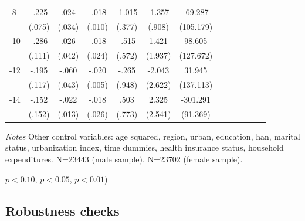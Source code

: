 \begin{table}[p]
\begin{adjustbox}{max width=\linewidth}
\begin{threeparttable}
{\begin{tabular}{l*{6}{S S}}
-8             &    -.225\sym{***}&     .024         &    -.018\sym{*}  &   -1.015\sym{***}&   -1.357         &  -69.287         \\
                &   (.075)         &   (.034)         &   (.010)         &   (.377)         &   (.908)         &(105.179)         \\
-10            &    -.286\sym{**} &     .026         &    -.018         &    -.515         &    1.421         &   98.605         \\
                &   (.111)         &   (.042)         &   (.024)         &   (.572)         &  (1.937)         &(127.672)         \\
-12           &    -.195\sym{*}  &    -.060         &    -.020\sym{***}&    -.265         &   -2.043         &   31.945         \\
                &   (.117)         &   (.043)         &   (.005)         &   (.948)         &  (2.622)         &(137.113)         \\
-14           &    -.152         &    -.022\sym{*}  &    -.018         &     .503         &    2.325         & -301.291\sym{***}\\
                &   (.152)         &   (.013)         &   (.026)         &   (.773)         &  (2.541)         & (91.369)         \\   
\bottomrule
\end{tabular}
\begin{tablenotes}
\item \textit{Notes} Other control variables: age squared, region, urban, education, han, marital status, urbanization index, time dummies, health insurance status, household expenditures. N=23443 (male sample), N=23702 (female sample).
\item \sym{*} \(p<0.10\), \sym{**} \(p<0.05\), \sym{***} \(p<0.01\))
\end{tablenotes}
}
\end{threeparttable}
\end{adjustbox}
\end{table}
\FloatBarrier

\clearpage
\subsection*{Robustness checks}

